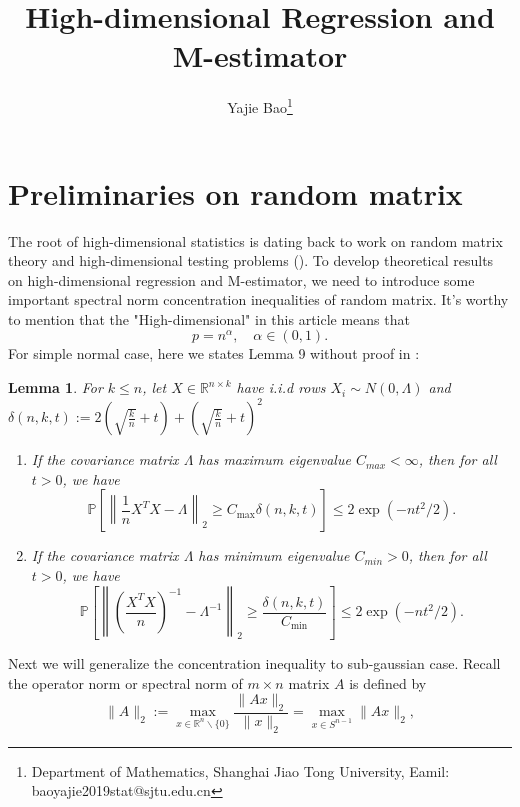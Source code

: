 \documentclass[12pt]{article}
\numberwithin{equation}{section}
\newtheorem{lemma}[theorem]{Lemma}
\begin{document}
\title{High-dimensional Regression and M-estimator}

\author{Yajie Bao\thanks{Department of Mathematics, Shanghai Jiao Tong University, Eamil: baoyajie2019stat@sjtu.edu.cn}}
\maketitle
\section{Preliminaries on random matrix}
The root of high-dimensional statistics is dating back to work on random matrix theory and high-dimensional testing problems (\citet{negahban2012unified}). To develop theoretical results on high-dimensional regression and M-estimator, we need to introduce some important spectral norm concentration inequalities of random matrix. It's worthy to mention that the "High-dimensional" in this article means that
$$
p=n^{\alpha},\quad \alpha\in (0,1).
$$
For simple normal case, here we states Lemma 9 without proof in \citet{wainwright2009sharp}:
\begin{lemma}
	For $k\leq n$, let $X\in \mathbb{R}^{n\times k}$ have i.i.d rows $X_{i} \sim N(0, \Lambda)$ and $\delta(n, k, t):=2(\sqrt{\frac{k}{n}}+t)+(\sqrt{\frac{k}{n}}+t)^{2}$
	\begin{enumerate}
		\item If the covariance matrix $\Lambda$ has maximum eigenvalue $C_{max}<\infty$, then for all $t>0$, we have
		\begin{equation}
		\mathbb{P}\left[\left\|\frac{1}{n} X^{T} X-\Lambda\right\|_{2} \geq C_{\max } \delta(n, k, t)\right] \leq 2 \exp \left(-n t^{2} / 2\right).
		\end{equation}
		\item If the covariance matrix $\Lambda$ has minimum eigenvalue $C_{min}>0$, then for all $t>0$, we have
		\begin{equation}
		\mathbb{P}\left[\left\|\left(\frac{X^{T} X}{n}\right)^{-1}-\Lambda^{-1}\right\|_{2} \geq \frac{\delta(n, k, t)}{C_{\min }}\right] \leq 2 \exp \left(-n t^{2} / 2\right).
		\end{equation}
	\end{enumerate}
\end{lemma}
Next we will generalize the concentration inequality to sub-gaussian case. Recall the operator norm or spectral norm of $m\times n$ matrix $A$ is defined by
$$
\|A\|_2:=\max _{x \in \mathbb{R}^{n} \backslash\{0\}} \frac{\|A x\|_{2}}{\|x\|_{2}}=\max _{x \in S^{n-1}}\|A x\|_{2},
$$
\end{document}
